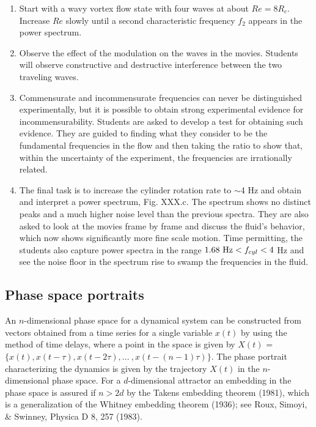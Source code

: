 \documentclass[%
 amsmath,amssymb,
 aps,
floatfix,
aps,prd,longbibliography,
notitlepage
]{revtex4-1}
\begin{document}
\begin{enumerate}
\begin{enumerate}
\item  Start with a wavy vortex flow state with four waves at about $Re=8R_c$.  Increase $Re$ slowly until a second characteristic frequency $f_2$ appears in the power spectrum.  
\item  Observe the effect of the modulation on the waves in the movies. Students will observe constructive and destructive interference between the two traveling waves.
\item  Commensurate and incommensurate frequencies can never be distinguished experimentally, but it is possible to obtain strong experimental evidence for incommensurability.  Students are asked to develop a test for obtaining such evidence. They are guided to finding what they consider to be the fundamental frequencies in the flow and then taking the ratio to show that, within the uncertainty of the experiment, the frequencies are irrationally related.
\item The final task is to increase the cylinder rotation rate to $\sim$4 Hz and obtain and interpret a power spectrum, Fig. XXX.c.  The spectrum shows no distinct peaks and a much higher noise level than the previous spectra. They are also asked to look at the movies frame by frame and discuss the fluid's behavior, which now shows significantly more fine scale motion. Time permitting, the students  also capture power spectra in the range $1.68 {\rm ~Hz} <f_{cyl}<4$ Hz and see the noise floor in the spectrum rise to swamp the frequencies in the fluid.
\end{enumerate}
\end{enumerate}


\subsection{Phase space portraits}

An $n$-dimensional phase space for a dynamical system can be constructed from vectors obtained from a time series for a single variable $x(t)$ by using the method of time delays, where a point in the space is given by $X(t)$ = $\{x(t), x(t-\tau), x(t-2\tau), . . .  \ , x(t-(n-1)\tau)\}$. The phase portrait characterizing the dynamics is given by the trajectory $X(t)$ in the $n$-dimensional phase space.  For a $d$-dimensional attractor an embedding in the phase space is assured if $n > 2d$ by the Takens embedding theorem (1981), which is a generalization of the Whitney embedding theorem (1936); see Roux, Simoyi, $\&$ Swinney, Physica D 8, 257 (1983).
\end{document}
